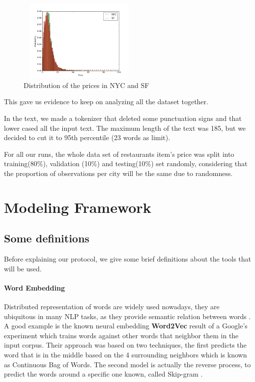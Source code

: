\documentclass[11pt,letterpaper]{article}
\begin{document}
   \begin{figure}[thpb]
      \centering
      \includegraphics[width=6cm, height=4cm]{dist_sf_nyc_prices}
      \caption{Distribution of the prices in NYC and SF}
      \label{fig:price_dist}
   \end{figure}

This gave us evidence to keep on analyzing all the dataset together. 

In the text, we made a tokenizer that deleted some punctuation signs and that lower cased all the input text. The maximum length of the text was 185, but we decided to cut it to 95th percentile (23 words as limit).

For all our runs, the whole data set of restaurants item's price was split into training(80\%), validation (10\%) and testing(10\%) set randomly, considering that the proportion of observations per city will be the same due to randomness. 

\section{Modeling Framework}
\subsection{Some definitions}
Before explaining our protocol, we give some brief definitions about the tools that will be used.
\paragraph{Word Embedding}
Distributed representation of words are widely used nowadays, they are ubiquitous in many NLP tasks, as they provide semantic relation between words \cite{hill2016learning}.  A good example is the known neural embedding \textbf{Word2Vec} result of a Google's experiment which trains words against other words that neighbor them in the input corpus. Their approach was based on two techniques, the first predicts the word that is in the middle based on the 4 surrounding neighbors which is known as Continuous Bag of Words. The second model is actually the reverse process, to predict the words around a specific one known, called Skip-gram \cite{mikolov2013distributed,mikolov2013efficient}. 
\end{document}
